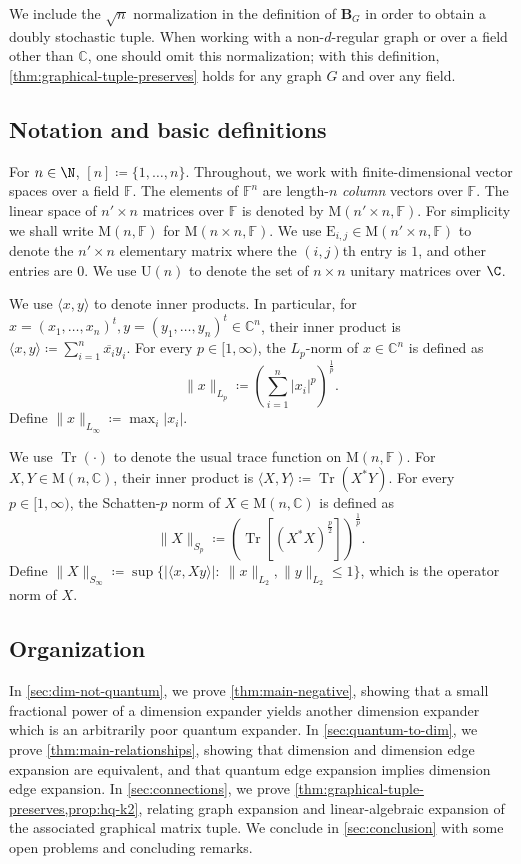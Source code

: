 \documentclass{toc}
\theoremstyle{plain}
\numberwithin{equation}{section}
\theoremstyle{definition}
\newcommand{\F}{\mathbb{F}}
\newcommand{\bC}{\mathbb{C}}
\DeclareMathOperator{\trace}{Tr}
\newcommand{\norm}[1]{\lVert#1\rVert}
\newcommand{\M}{\mathrm{M}}
\newcommand{\U}{\mathrm{U}}
\newcommand{\tuple}[1]{\mathbf{#1}}
\newcommand{\vB}{\tuple{B}}
\newcommand{\E}{\mathrm{E}}
\begin{document}
\begin{remark}
    We include the $\sqrt n$ normalization in the definition of $\vB_G$ in order to obtain a doubly stochastic tuple. When working with a non-$d$-regular graph or over a field other than $\bC$, one should omit this normalization; with this definition, \cref{thm:graphical-tuple-preserves} holds for any graph $G$ and over any field.
\end{remark}





\subsection{Notation and basic definitions}\label{sec:prel}
For $n\in \N$, $[n]\coloneqq \{1, \dots, n\}$. 
Throughout, we work with finite-dimensional vector spaces over a field $\F$. 
The elements of $\F^n$ are length-$n$ \emph{column} vectors over 
$\F$. 
The linear space of 
$n'\times n$ matrices over $\F$ is denoted by $\M(n'\times n,\F)$. For simplicity we shall write 
$\M(n,\F)$ for 
$\M(n\times n,\F)$. We use $\E_{i, j}\in \M(n'\times n, \F)$ to denote 
the $n'\times n$ elementary matrix where the $(i, j)$th entry is $1$, and other entries are $0$. We use $\U(n)$ to denote the set of $n\times n$ unitary matrices over $\C$. 

We use $\langle x, y\rangle$ to denote inner products. In particular, for $x=(x_1, \dots, x_n)^t,y=(y_1, \dots, y_n)^t\in\bC^n$, their inner product is
$
\langle x,y\rangle\coloneqq \sum_{i=1}^n \overline{x_i}y_i.
$
For every $p\in[1,\infty)$, the $L_p$-norm of $x\in\bC^n$ 
is defined as 
\[
\norm{x}_{L_p}\coloneqq \left(\sum^n_{i=1}|x_i|^p\right)^{\frac{1}{p}}.
\]
Define $\norm{x}_{L_\infty}\coloneqq \max_i|x_i|$. 

We use $\trace(\cdot)$ to denote the usual trace function on $\M(n,\F)$. For $X,Y\in \M(n,\bC)$, their inner product is $\langle X,Y\rangle\coloneqq \trace(X^*Y)$.
For every $p\in[1,\infty)$, the Schatten-$p$ norm of $X\in \M(n,\bC)$ is defined as
\[
\norm{X}_{S_p}\coloneqq \left(\trace\left[(X^*X)^{\frac{p}{2}}\right]\right)^{\frac{1}{p}}.
\]
Define $\norm{X}_{S_\infty}\coloneqq \sup\{|\langle 
x,Xy\rangle|:~\norm{x}_{L_2},\norm{y}_{L_2}\leq 1\}$, which is the operator norm 
of $X$. 

\subsection{Organization}
In \cref{sec:dim-not-quantum}, we prove \cref{thm:main-negative}, showing that a small fractional power of a dimension expander yields another dimension expander which is an arbitrarily poor quantum expander. In \cref{sec:quantum-to-dim}, we prove \cref{thm:main-relationships}, showing that dimension and dimension edge expansion are equivalent, and that quantum edge expansion implies dimension edge expansion. In \cref{sec:connections}, we prove \cref{thm:graphical-tuple-preserves,prop:hq-k2}, relating graph expansion and linear-algebraic expansion of the associated graphical matrix tuple. We conclude in \cref{sec:conclusion} with some open problems and concluding remarks.
\end{document}

